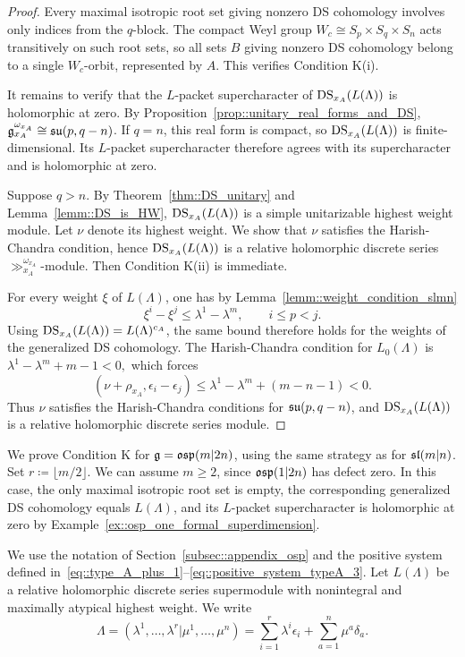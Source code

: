 \begin{proof}
Every maximal isotropic root set giving nonzero DS cohomology involves only indices from the $q$-block. The compact Weyl group
$
W_c\cong S_p\times S_q\times S_n
$
acts transitively on such root sets, so all sets $B$ giving nonzero DS cohomology belong to a single $W_c$-orbit, represented by $A$. This verifies Condition K(i).

It remains to verify that the $L$-packet supercharacter of $\DS_{x_A}(L(\Lambda))$ is holomorphic at zero. By Proposition~\ref{prop::unitary_real_forms_and_DS}, $\gg_{x_{A}}^{\omega_{x_{A}}}\cong \su(p,q-n)$. If $q=n$, this real form is compact, so $\DS_{x_A}(L(\Lambda))$ is finite-dimensional. Its $L$-packet supercharacter therefore agrees with its supercharacter and is holomorphic at zero.

Suppose $q>n$. By Theorem~\ref{thm::DS_unitary} and Lemma~\ref{lemm::DS_is_HW}, $\DS_{x_A}(L(\Lambda))$ is a simple unitarizable highest weight module. Let $\nu$ denote its highest weight. We show that $\nu$ satisfies the Harish-Chandra condition, hence $\DS_{x_{A}}(L(\Lambda))$ is a relative holomorphic discrete series $\gg_{x_{A}}^{\omega_{x_{A}}}$-module. Then Condition K(ii) is immediate.

For every weight $\xi$ of $L(\Lambda)$, one has by Lemma~\ref{lemm::weight_condition_slmn}
\[
\xi^i-\xi^j
\leq \lambda^1-\lambda^m,
\qquad i\leq p<j.
\]
Using $\DS_{x_{A}}(L(\Lambda))=L(\Lambda)^{c_{A}}$, the same bound therefore holds for the weights of the generalized DS cohomology. The Harish-Chandra condition for $L_{0}(\Lambda)$ is
$
\lambda^1-\lambda^m+m-1<0,
$
which forces
\[
(\nu+\rho_{x_A},\epsilon_i-\epsilon_j)
\leq
\lambda^1-\lambda^m+(m-n-1)<0.
\]
Thus $\nu$ satisfies the Harish-Chandra conditions for $\su(p,q-n)$, and $\DS_{x_A}(L(\Lambda))$ is a relative holomorphic discrete series module.
\end{proof}


We prove Condition K for $\gg=\osp(m\vert2n)$, using the same strategy as for $\sl(m\vert n)$. Set $r\coloneqq\lfloor m/2\rfloor$. We can assume $m\geq2$, since $\osp(1\vert2n)$ has defect zero. In this case, the only maximal isotropic root set is empty, the corresponding generalized DS cohomology equals $L(\Lambda)$, and its $L$-packet supercharacter is holomorphic at zero by Example~\ref{ex::osp_one_formal_superdimension}.


We use the notation of Section~\ref{subsec::appendix_osp} and the positive system defined in~\eqref{eq::type_A_plus_1}--\eqref{eq::positive_system_typeA_3}. Let $L(\Lambda)$ be a relative holomorphic discrete series supermodule with nonintegral and maximally atypical highest weight. We write
\begin{equation}
\Lambda
=(\lambda^{1}, \ldots, \lambda^{r}\vert \mu^{1},\ldots,\mu^{n})=
\sum_{i=1}^r\lambda^i\epsilon_i
+
\sum_{a=1}^n\mu^a\delta_a.
\end{equation}

